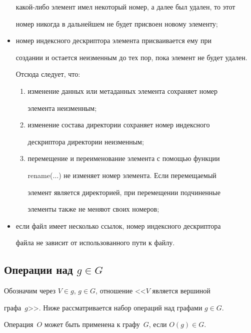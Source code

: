 \begin{multicols}{2}
\begin{itemize}
какой-либо элемент имел некоторый номер, а далее был удален, то этот 


номер никогда в дальнейшем не будет присвоен новому элементу;


\item номер индексного дескриптора элемента присваивается ему при 


создании и остается неизменным до тех пор, пока элемент не будет удален. 


Отсюда следует, что:


\begin{enumerate}[(1)]


\item изменение данных или метаданных элемента сохраняет номер 


элемента неизменным;


\item изменение состава директории сохраняет номер индексного 


дескриптора директории неизменным;


\item перемещение и переименование элемента с помощью функции 


rename($\ldots$) не изменяет номер элемента. Если перемещаемый 


элемент является директорией, при перемещении подчиненные 


элементы также не меняют своих номеров;


\end{enumerate}


\item если файл имеет несколько ссылок, номер индексного дескриптора 


файла не зависит от использованного пути к файлу. 


\end{itemize}





\subsection{Операции над $g\in G$}


     


     Обозначим через $V\in g$, $g\in G$, отношение <<$V$ является вершиной 


графа~$g$>>. Ниже рассматривается набор операций над графами $g\in G$. 


Операция~$O$ может быть применена к графу~$G$, если $O(g)\in G$.



\end{multicols}
